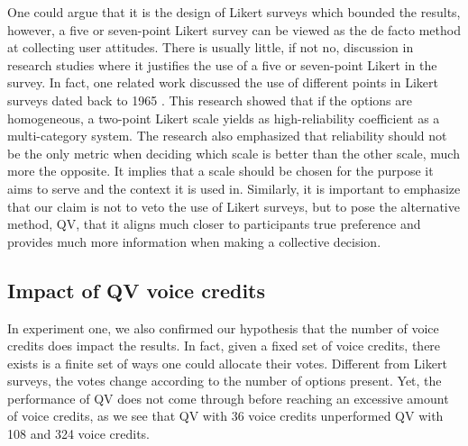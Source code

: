 One could argue that it is the design of Likert surveys which bounded the results, however,
a five or seven-point Likert survey can be viewed as the de facto method at collecting user attitudes.
There is usually little, if not no, discussion in research studies where it justifies the use of a five or seven-point Likert in the survey.
In fact, one related work discussed the use of different points in Likert surveys dated back to 1965 \cite{komorita1965number}. 
This research showed that if the options are homogeneous, a two-point Likert scale yields as high-reliability coefficient as a multi-category system.
The research also emphasized that reliability should not be the only metric when deciding which scale is better than the other scale, much more the opposite.
It implies that a scale should be chosen for the purpose it aims to serve and the context it is used in.
Similarly, it is important to emphasize that our claim is not to veto the use of Likert surveys, but to pose the alternative method, QV, that it aligns much closer to participants true preference and provides much more information when making a collective decision.\par

\subsection{Impact of QV voice credits}
In experiment one, we also confirmed our hypothesis that the number of voice credits does impact the results. 
In fact, given a fixed set of voice credits, there exists is a finite set of ways one could allocate their votes. 
Different from Likert surveys, the votes change according to the number of options present.
Yet, the performance of QV does not come through before reaching an excessive amount of voice credits, as we see that QV with 36 voice credits unperformed QV with 108 and 324 voice credits.

